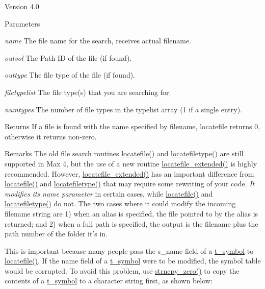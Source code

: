 \begin{DoxyVersion}{Version}
4.0
\end{DoxyVersion}

\begin{DoxyParams}{Parameters}
\item[{\em name}]The file name for the search, receives actual filename. \item[{\em outvol}]The Path ID of the file (if found). \item[{\em outtype}]The file type of the file (if found). \item[{\em filetypelist}]The file type(s) that you are searching for. \item[{\em numtypes}]The number of file types in the typelist array (1 if a single entry).\end{DoxyParams}
\begin{DoxyReturn}{Returns}
If a file is found with the name specified by filename, locatefile returns 0, otherwise it returns non-\/zero.
\end{DoxyReturn}
\begin{DoxyRemark}{Remarks}
The old file search routines \hyperlink{group__files_ga4d2637351d4a98b83e9a59ef7d500568}{locatefile()} and \hyperlink{group__files_ga8f43f2c9eb53933bbf354997eebb495d}{locatefiletype()} are still supported in Max 4, but the use of a new routine \hyperlink{group__files_gaa2899b66e1457da0ee333f9407230ccd}{locatefile\_\-extended()} is highly recommended. However, \hyperlink{group__files_gaa2899b66e1457da0ee333f9407230ccd}{locatefile\_\-extended()} has an important difference from \hyperlink{group__files_ga4d2637351d4a98b83e9a59ef7d500568}{locatefile()} and \hyperlink{group__files_ga8f43f2c9eb53933bbf354997eebb495d}{locatefiletype()} that may require some rewriting of your code. {\itshape It modifies its name parameter\/} in certain cases, while \hyperlink{group__files_ga4d2637351d4a98b83e9a59ef7d500568}{locatefile()} and \hyperlink{group__files_ga8f43f2c9eb53933bbf354997eebb495d}{locatefiletype()} do not. The two cases where it could modify the incoming filename string are 1) when an alias is specified, the file pointed to by the alias is returned; and 2) when a full path is specified, the output is the filename plus the path number of the folder it's in.
\end{DoxyRemark}
This is important because many people pass the s\_\-name field of a \hyperlink{structt__symbol}{t\_\-symbol} to \hyperlink{group__files_ga4d2637351d4a98b83e9a59ef7d500568}{locatefile()}. If the name field of a \hyperlink{structt__symbol}{t\_\-symbol} were to be modified, the symbol table would be corrupted. To avoid this problem, use \hyperlink{group__misc_ga0022303fac866c8f5757aa56b67ce29d}{strncpy\_\-zero()} to copy the contents of a \hyperlink{structt__symbol}{t\_\-symbol} to a character string first, as shown below: 
